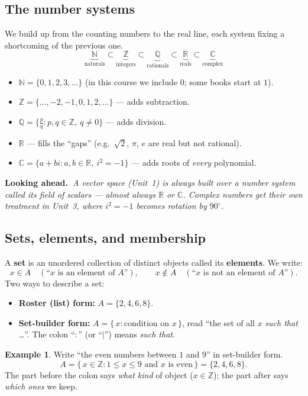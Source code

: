 \documentclass[11pt]{article}
\theoremstyle{definition}
\newtheorem{example}{Example}[section]
\newcommand{\lookahead}[1]{%
  \par\smallskip\noindent
  {\sffamily\bfseries\color{BrickRed}Looking ahead.~}\textit{#1}\par\smallskip}
\newcommand{\R}{\mathbb{R}}
\newcommand{\C}{\mathbb{C}}
\newcommand{\Z}{\mathbb{Z}}
\newcommand{\N}{\mathbb{N}}
\newcommand{\Q}{\mathbb{Q}}
\begin{document}
\subsection{The number systems}
We build up from the counting numbers to the real line, each system fixing a
shortcoming of the previous one.
\[
\underbrace{\N}_{\text{naturals}}\subset
\underbrace{\Z}_{\text{integers}}\subset
\underbrace{\Q}_{\text{rationals}}\subset
\underbrace{\R}_{\text{reals}}\subset
\underbrace{\C}_{\text{complex}}
\]
\begin{itemize}[leftmargin=1.4em,itemsep=1pt]
  \item $\N=\{0,1,2,3,\dots\}$ (in this course we include $0$; some books start at $1$).
  \item $\Z=\{\dots,-2,-1,0,1,2,\dots\}$ --- adds subtraction.
  \item $\Q=\bigl\{\tfrac{p}{q}: p,q\in\Z,\ q\neq 0\bigr\}$ --- adds division.
  \item $\R$ --- fills the ``gaps'' (e.g.\ $\sqrt{2}$, $\pi$, $e$ are real but not rational).
  \item $\C=\{a+bi: a,b\in\R,\ i^2=-1\}$ --- adds roots of \emph{every} polynomial.
\end{itemize}
\lookahead{A vector space (Unit~1) is always built \emph{over} a number system
called its field of scalars --- almost always $\R$ or $\C$. Complex numbers get
their own treatment in Unit~3, where $i^2=-1$ becomes rotation by $90^\circ$.}

\subsection{Sets, elements, and membership}
A \textbf{set} is an unordered collection of distinct objects called its
\textbf{elements}. We write:
\[
x\in A \quad(\text{``$x$ is an element of $A$''}), \qquad
x\notin A \quad(\text{``$x$ is not an element of $A$''}).
\]
Two ways to describe a set:
\begin{itemize}[leftmargin=1.4em,itemsep=1pt]
  \item \textbf{Roster (list) form:} $A=\{2,4,6,8\}$.
  \item \textbf{Set-builder form:} $A=\{\,x : \text{condition on }x\,\}$, read
        ``the set of all $x$ \emph{such that} \dots''. The colon ``$:$'' (or
        ``$\mid$'') means \emph{such that}.
\end{itemize}

\begin{example}
Write ``the even numbers between $1$ and $9$'' in set-builder form.
\[
A=\{\,x\in\Z : 1\le x\le 9 \text{ and } x \text{ is even}\,\}=\{2,4,6,8\}.
\]
The part before the colon says \emph{what kind} of object ($x\in\Z$); the part
after says \emph{which ones} we keep.
\end{example}
\end{document}
